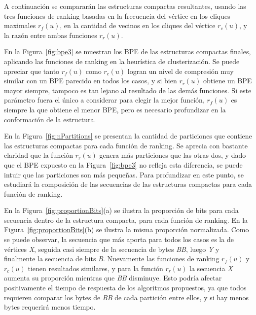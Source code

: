 A continuación se compararán las estructuras compactas resultantes, usando las tres funciones de ranking basadas en la frecuencia del vértice en los cliques maximales $r_{f}(u)$, en la cantidad de vecinos en los cliques del vértice $r_{c}(u)$, y la razón entre ambas funciones $r_{r}(u)$. 

En la Figura~\ref{fig:bpe3} se muestran los BPE de las estructuras compactas finales, aplicando las funciones de ranking en la heurística de clusterización. Se puede apreciar que tanto $r_{f}(u)$ como $r_{c}(u)$ logran un nivel de compresión muy similar con un BPE parecido en todos los casos, y si bien $r_{r}(u)$ obtiene un BPE mayor siempre, tampoco es tan lejano al resultado de las demás funciones. Si este parámetro fuera el único a considerar para elegir la mejor función, $r_{f}(u)$ es siempre la que obtiene el menor BPE, pero es necesario profundizar en la conformación de la estructura.

%


En la Figura~\ref{fig:nPartitions} se presentan la cantidad de particiones que contiene las estructuras compactas para cada función de ranking. Se aprecia con bastante claridad que la función $r_{r}(u)$ genera más particiones que las otras dos, y dado que el BPE expuesto en la Figura~\ref{fig:bpe3} no refleja esta diferencia, se puede intuir que las particiones son más pequeñas. Para profundizar en este punto, se estudiará la composición de las secuencias de las estructuras compactas para cada función de ranking.



En la Figura~\ref{fig:proportionBits}(a) se ilustra la proporción de bits para cada secuencia dentro de la estructura compacta, para cada función de ranking. En la Figura~\ref{fig:proportionBits}(b) se ilustra la misma proporción normalizada. Como se puede observar, la secuencia que más aporta para todos los casos es la de vértices \textit{X}, seguida casi siempre de la secuencia de bytes \textit{BB}, luego \textit{Y} y finalmente la secuencia de bits \textit{B}. Nuevamente las funciones de ranking $r_{f}(u)$ y $r_{c}(u)$ tienen resultados similares, y para la función $r_{r}(u)$ la secuencia \textit{X} aumenta su proporción mientras que \textit{BB} disminuye. Esto podría afectar positivamente el tiempo de respuesta de los algoritmos propuestos, ya que todos requieren comparar los bytes de \textit{BB} de cada partición entre ellos, y si hay menos bytes requerirá menos tiempo.

